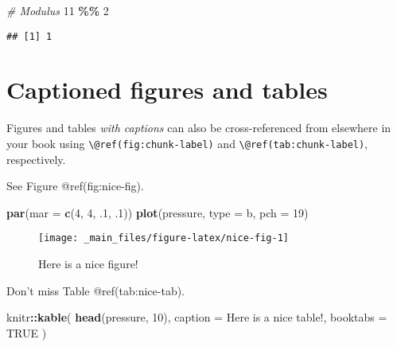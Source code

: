 \documentclass[
]{book}
\newenvironment{Shaded}{\begin{snugshade}}{\end{snugshade}}
\newcommand{\AttributeTok}[1]{\textcolor[rgb]{0.13,0.29,0.53}{#1}}
\newcommand{\CommentTok}[1]{\textcolor[rgb]{0.56,0.35,0.01}{\textit{#1}}}
\newcommand{\ConstantTok}[1]{\textcolor[rgb]{0.56,0.35,0.01}{#1}}
\newcommand{\DecValTok}[1]{\textcolor[rgb]{0.00,0.00,0.81}{#1}}
\newcommand{\FunctionTok}[1]{\textcolor[rgb]{0.13,0.29,0.53}{\textbf{#1}}}
\newcommand{\NormalTok}[1]{#1}
\newcommand{\SpecialCharTok}[1]{\textcolor[rgb]{0.81,0.36,0.00}{\textbf{#1}}}
\newcommand{\StringTok}[1]{\textcolor[rgb]{0.31,0.60,0.02}{#1}}
\begin{document}
\begin{Shaded}
\begin{Highlighting}[]
\CommentTok{\# Modulus}
\DecValTok{11} \SpecialCharTok{\%\%} \DecValTok{2}
\end{Highlighting}
\end{Shaded}

\begin{verbatim}
## [1] 1
\end{verbatim}

\hypertarget{captioned-figures-and-tables}{%
\section{Captioned figures and
tables}\label{captioned-figures-and-tables}}

Figures and tables \emph{with captions} can also be cross-referenced
from elsewhere in your book using
\texttt{\textbackslash{}@ref(fig:chunk-label)} and
\texttt{\textbackslash{}@ref(tab:chunk-label)}, respectively.

See Figure @ref(fig:nice-fig).

\begin{Shaded}
\begin{Highlighting}[]
\FunctionTok{par}\NormalTok{(}\AttributeTok{mar =} \FunctionTok{c}\NormalTok{(}\DecValTok{4}\NormalTok{, }\DecValTok{4}\NormalTok{, .}\DecValTok{1}\NormalTok{, .}\DecValTok{1}\NormalTok{))}
\FunctionTok{plot}\NormalTok{(pressure, }\AttributeTok{type =} \StringTok{\textquotesingle{}b\textquotesingle{}}\NormalTok{, }\AttributeTok{pch =} \DecValTok{19}\NormalTok{)}
\end{Highlighting}
\end{Shaded}

\begin{figure}

{\centering \texttt{[image: \_main\_files/figure-latex/nice-fig-1]} 

}

\caption{Here is a nice figure!}\label{fig:nice-fig}
\end{figure}

Don't miss Table @ref(tab:nice-tab).

\begin{Shaded}
\begin{Highlighting}[]
\NormalTok{knitr}\SpecialCharTok{::}\FunctionTok{kable}\NormalTok{(}
  \FunctionTok{head}\NormalTok{(pressure, }\DecValTok{10}\NormalTok{), }\AttributeTok{caption =} \StringTok{\textquotesingle{}Here is a nice table!\textquotesingle{}}\NormalTok{,}
  \AttributeTok{booktabs =} \ConstantTok{TRUE}
\NormalTok{)}
\end{Highlighting}
\end{Shaded}
\end{document}
